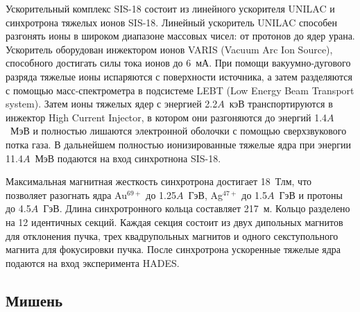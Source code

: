 Ускорительный комплекс SIS-18 состоит из линейного ускорителя UNILAC и синхротрона тяжелых ионов SIS-18.
Линейный ускоритель UNILAC способен разгонять ионы в широком диапазоне массовых чисел: от протонов до ядер урана.
Ускоритель оборудован инжектором ионов VARIS (Vacuum Arc Ion Source), способного достигать силы тока ионов до 6~мА.
При помощи вакуумно-дугового разряда тяжелые ионы испаряются с поверхности источника, а затем разделяются с помощью масс-спектрометра в подсистеме LEBT (Low Energy Beam Transport system).
Затем ионы тяжелых ядер с энергией 2.2$A$~кэВ транспортируются в инжектор High Current Injector, в котором они разгоняются до энергий 1.4$A$~МэВ и полностью лишаются электронной оболочки с помощью сверхзвукового потка газа.
В дальнейшем полностью ионизированные тяжелые ядра при энергии 11.4$A$~МэВ подаются на вход синхротнона SIS-18.

Максимальная магнитная жесткость синхротрона достигает 18~Тлм, что позволяет разогнать ядра Au$^{69+}$ до 1.25$A$~ГэВ, Ag$^{47+}$ до 1.5$A$~ГэВ и протоны до 4.5$A$~ГэВ.
Длина синхротронного кольца составляет 217~м.
Кольцо разделено на 12 идентичных секций.
Каждая секция состоит из двух дипольных магнитов для отклонения пучка, трех квадрупольных магнитов и одного секступольного магнита для фокусировки пучка.
После синхротрона ускоренные тяжелые ядра подаются на вход эксперимента HADES.

\subsection{ Мишень }

